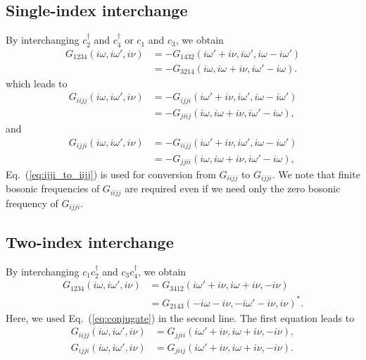 \documentclass[disablejfam,12pt]{article}
\begin{document}
\subsection{Single-index interchange}
By interchanging $c_2^{\dag}$ and $c_4^{\dag}$ or $c_1$ and $c_3$, we obtain
\begin{align}
	G_{1234}(i \omega, i \omega', i\nu)
	&= - G_{1432}(i \omega' + i\nu, i \omega', i\omega - i\omega') \\
	&= - G_{3214}(i \omega, i \omega + i\nu, i\omega' - i\omega).
\end{align}
which leads to
\begin{align}
	G_{iijj}(i \omega, i \omega', i\nu)
	&= - G_{ijji}(i \omega' + i\nu, i \omega', i\omega - i\omega') \\
	&= - G_{jiij}(i \omega, i \omega + i\nu, i\omega' - i\omega),
\end{align}
and
\begin{align}
	G_{ijji}(i \omega, i \omega', i\nu)
	&= - G_{iijj}(i \omega' + i\nu, i \omega', i\omega - i\omega') \label{eq:ijji_to_iijj}\\
	&= - G_{jjii}(i \omega, i \omega + i\nu, i\omega' - i\omega),
\end{align}
Eq.~(\ref{eq:ijji_to_iijj}) is used for conversion from $G_{iijj}$ to $G_{ijji}$.
We note that finite bosonic frequencies of $G_{iijj}$ are required even if we need only the zero bosonic frequency of $G_{ijji}$.




\subsection{Two-index interchange}
By interchanging $c_1 c_2^{\dag}$ and $c_3 c_4^{\dag}$, we obtain
\begin{align}
	G_{1234}(i \omega, i \omega', i\nu) &= G_{3412}(i \omega' + i\nu, i \omega + i\nu, -i\nu) \\
	&= G_{2143}(-i \omega - i\nu, -i \omega' - i\nu, i\nu)^*.
\end{align}
Here, we used Eq.~(\ref{eq:conjugate}) in the second line.
The first equation leads to
\begin{align}
	G_{iijj}(i \omega, i \omega', i\nu) &= G_{jjii}(i \omega' + i\nu, i \omega + i\nu, -i\nu), \\
	G_{ijji}(i \omega, i \omega', i\nu) &= G_{jiij}(i \omega' + i\nu, i \omega + i\nu, -i\nu).
\end{align}
\end{document}
